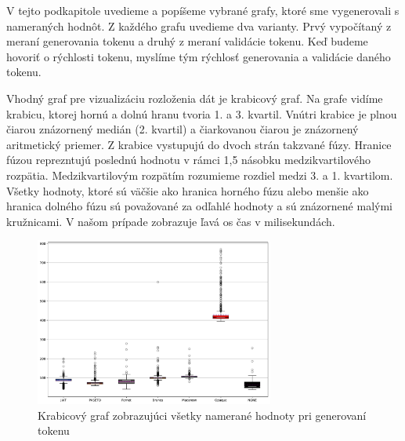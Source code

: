 V tejto podkapitole uvedieme a popíšeme vybrané grafy, ktoré sme vygenerovali s nameraných hodnôt. Z každého grafu uvedieme dva varianty. Prvý vypočítaný z meraní generovania tokenu a druhý z meraní validácie tokenu. Keď budeme hovoriť o rýchlosti tokenu, myslíme tým rýchlosť generovania a validácie daného tokenu.

Vhodný graf pre vizualizáciu rozloženia dát je krabicový graf. Na grafe vidíme krabicu, ktorej hornú a dolnú hranu tvoria 1. a 3. kvartil. Vnútri krabice je plnou čiarou znázornený medián (2. kvartil) a čiarkovanou čiarou je znázornený aritmetický priemer. Z krabice vystupujú do dvoch strán takzvané fúzy. Hranice fúzou reprezntujú poslednú hodnotu v rámci 1,5 násobku medzikvartilového rozpätia. Medzikvartilovým rozpätím rozumieme rozdiel medzi 3. a 1. kvartilom. Všetky hodnoty, ktoré sú väčšie ako hranica horného fúzu alebo menšie ako hranica dolného fúzu sú považované za odľahlé hodnoty a sú znázornené malými kružnicami. V našom prípade zobrazuje ľavá os čas v milisekundách.

\begin{figure}
  \centerline{\includegraphics[width=0.7\textwidth]{images/signin_boxplot_allW}}
  \caption[Krabicový graf -- generovanie, všetky hodnoty]{Krabicový graf zobrazujúci všetky namerané hodnoty pri generovaní tokenu}
  \label{fig:signin_boxplot_allW}
\end{figure}


